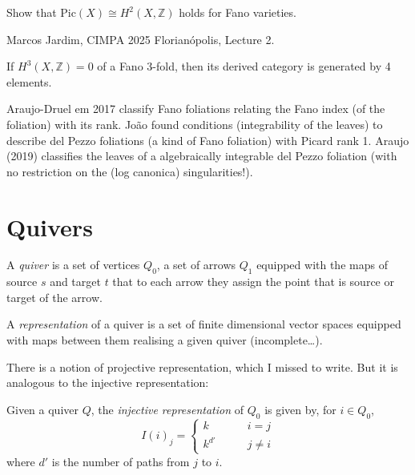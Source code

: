 \begin{exercise}
\label{exercise-Pic-H2-Fano}
Show that  $\text{Pic}(X)\cong H^{2}(X,\mathbb{Z})$ holds for Fano varieties.
\end{exercise}

\begin{remark}
\label{remark-derived-category-of-Fano-3-folds-with-vanishing-simplicial
-cohomology}
\begin{reference}
Marcos Jardim, CIMPA 2025 Florianópolis, Lecture 2.
\end{reference}
If $H^3(X,\mathbb{Z})=0$ of a Fano 3-fold, then its derived category is
generated by 4 elements.
\end{remark}

\medskip\noindent
Araujo-Druel em 2017 classify
Fano foliations relating the Fano index (of the foliation)
with its rank.
João found conditions 
(integrability of the leaves)
to describe del Pezzo foliations
(a kind of Fano foliation)
with Picard rank 1.
Araujo (2019) classifies the leaves of a algebraically integrable
del Pezzo foliation (with no restriction on the (log
canonica) singularities!).


\section{Quivers}
\label{section-quivers}

\begin{definition}
\label{definition-quiver}
A {\it quiver} is a set of vertices $Q_0$, a set of arrows $Q_1$ equipped with
the maps of source $s$ and target $t$ that to each arrow they assign the point
that is source or target of the arrow.
\end{definition}

\begin{definition}
\label{definition-representation-of-quiver}
A {\it representation} of a quiver is a set of finite dimensional vector spaces
equipped with maps between them realising a given quiver (incomplete…).
\end{definition}

There is a notion of projective representation, which I missed to write. But it
is analogous to the injective representation:

\begin{definition}
\label{definition-injective-representation-of-quivers}
Given a quiver $Q$, the {\it injective representation} of $Q_0$ is given by, for
$i \in Q_0$,
$$
I(i)_j=\begin{cases}
k\qquad &i=j \\
k^{d'}\qquad &j \neq i
\end{cases}
$$
where $d'$ is the number of paths from $j$ to $i$.
\end{definition}

